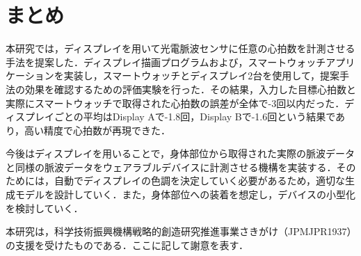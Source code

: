 \documentclass[Japanese,noauthor]{dicomopapers}
\begin{document}
\section{まとめ}
\label{sec:conclude}
本研究では，ディスプレイを用いて光電脈波センサに任意の心拍数を計測させる手法を提案した．ディスプレイ描画プログラムおよび，スマートウォッチアプリケーションを実装し，スマートウォッチとディスプレイ2台を使用して，提案手法の効果を確認するための評価実験を行った．その結果，入力した目標心拍数と実際にスマートウォッチで取得された心拍数の誤差が全体で-3回以内だった．ディスプレイごとの平均はDisplay Aで-1.8回，Display Bで-1.6回という結果であり，高い精度で心拍数が再現できた．\par

今後はディスプレイを用いることで，身体部位から取得された実際の脈波データと同様の脈波データをウェアラブルデバイスに計測させる機構を実装する．そのためには，自動でディスプレイの色調を決定していく必要があるため，適切な生成モデルを設計していく．また，身体部位への装着を想定し，デバイスの小型化を検討していく．



\begin{acknowledgment}
  本研究は，科学技術振興機構戦略的創造研究推進事業さきがけ（JPMJPR1937）の支援を受けたものである．ここに記して謝意を表す．
\end{acknowledgment}




\end{document}

